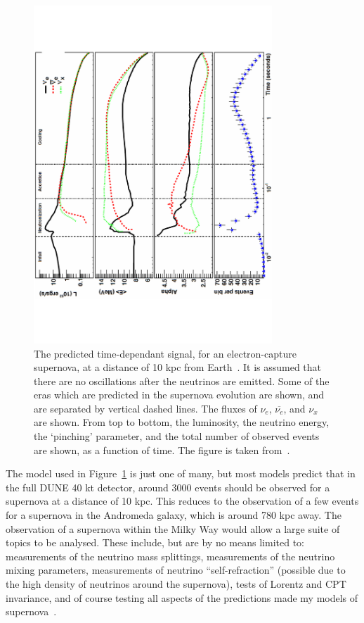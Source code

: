 \begin{figure}
  \centering
  \includegraphics[width=0.8\textwidth]{SupernovaBurstProfile}
  \caption[The predicted time-dependant signal, for an electron-capture supernova, at a distance of 10 kpc from Earth]
          {The predicted time-dependant signal, for an electron-capture supernova, at a distance of 10 kpc from Earth~\citep{Huedepohl:2009wh}. It is assumed that there are no oscillations after the neutrinos are emitted. Some of the eras which are predicted in the supernova evolution are shown, and are separated by vertical dashed lines. The fluxes of $\nu_e$, $\overline{\nu_e}$, and $\nu_x$ are shown. From top to bottom, the luminosity, the neutrino energy, the `pinching' parameter, and the total number of observed events are shown, as a function of time. The figure is taken from~\citep{DUNECDR_V2}.} 
  \label{fig:DUNE_Other_SN}
\end{figure}

The model used in Figure~\ref{fig:DUNE_Other_SN} is just one of many, but most models predict that in the full DUNE 40 kt detector, around 3000 events should be observed for a supernova at a distance of 10 kpc. This reduces to the observation of a few events for a supernova in the Andromeda galaxy, which is around 780 kpc away. The observation of a supernova within the Milky Way would allow a large suite of topics to be analysed. These include, but are by no means limited to: measurements of the neutrino mass splittings, measurements of the neutrino mixing parameters, measurements of neutrino ``self-refraction'' (possible due to the high density of neutrinos around the supernova), tests of Lorentz and CPT invariance, and of course testing all aspects of the predictions made my models of supernova~\citep{DUNECDR_V2}. \\


